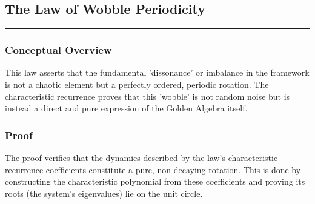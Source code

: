 \subsection*{The Law of Wobble Periodicity}
\hrule
\vspace{0.3cm}
\vspace{0.5cm}

\subsubsection*{Conceptual Overview}
This law asserts that the fundamental 'dissonance' or imbalance in the framework is not a chaotic element but a perfectly ordered, periodic rotation. The characteristic recurrence proves that this 'wobble' is not random noise but is instead a direct and pure expression of the Golden Algebra itself.

\subsubsection*{Proof}
The proof verifies that the dynamics described by the law's characteristic recurrence coefficients constitute a pure, non-decaying rotation. This is done by constructing the characteristic polynomial from these coefficients and proving its roots (the system's eigenvalues) lie on the unit circle.

